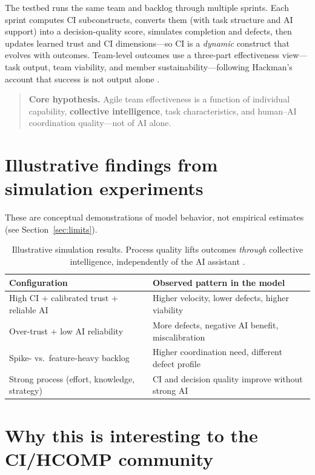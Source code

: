 \documentclass{article}
\begin{document}
The testbed runs the same team and backlog through multiple sprints. Each sprint computes CI subconstructs, converts them (with task structure and AI support) into a decision-quality score, simulates completion and defects, then updates learned trust and CI dimensions---so CI is a \emph{dynamic} construct that evolves with outcomes. Team-level outcomes use a three-part effectiveness view---task output, team viability, and member sustainability---following Hackman's account that success is not output alone \citep{Hackman1987,Wageman2005}.

\begin{quote}
\textbf{Core hypothesis.} Agile team effectiveness is a function of individual capability, \textbf{collective intelligence}, task characteristics, and human--AI coordination quality---not of AI alone.
\end{quote}

\section{Illustrative findings from simulation experiments}

These are conceptual demonstrations of model behavior, not empirical estimates (see Section~\ref{sec:limits}).

\begin{table}[h]
\centering
\small
\begin{tabular}{@{}ll@{}}
\toprule
\textbf{Configuration} & \textbf{Observed pattern in the model} \\
\midrule
High CI + calibrated trust + reliable AI & Higher velocity, lower defects, higher viability \\
Over-trust + low AI reliability & More defects, negative AI benefit, miscalibration \\
Spike- vs.\ feature-heavy backlog & Higher coordination need, different defect profile \\
Strong process (effort, knowledge, strategy) & CI and decision quality improve without strong AI \\
\bottomrule
\end{tabular}
\caption{Illustrative simulation results. Process quality lifts outcomes \emph{through} collective intelligence, independently of the AI assistant \citep{Riedl2021}.}
\end{table}

\section{Why this is interesting to the CI/HCOMP community}
\end{document}

